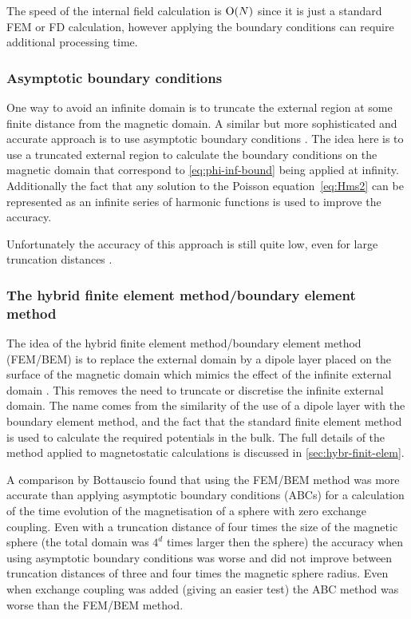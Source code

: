 The speed of the internal field calculation is $\text{O}{\left( N \right)}$ since it is just a standard FEM or FD calculation, however applying the boundary conditions can require additional processing time.



\subsubsection{Asymptotic boundary conditions}
\label{sec:asymptot-bcs}

One way to avoid an infinite domain is to truncate the external region at some finite distance from the magnetic domain.
A similar but more sophisticated and accurate approach is to use asymptotic boundary conditions \cite{Yang1997}.
The idea here is to use a truncated external region to calculate the boundary conditions on the magnetic domain that correspond to \cref{eq:phi-inf-bound} being applied at infinity.
Additionally the fact that any solution to the Poisson equation~\cref{eq:Hms2} can be represented as an infinite series of harmonic functions is used to improve the accuracy.

Unfortunately the accuracy of this approach is still quite low, even for large truncation distances \cite{Bottauscio2008}.


\subsubsection{The hybrid finite element method/boundary element method}
\label{sec:bound-elem-meth}

The idea of the hybrid finite element method/boundary element method (FEM/BEM) is to replace the external domain by a dipole layer placed on the surface of the magnetic domain which mimics the effect of the infinite external domain \cite{Fredkin1990}.
This removes the need to truncate or discretise the infinite external domain.
The name comes from the similarity of the use of a dipole layer with the boundary element method, and the fact that the standard finite element method is used to calculate the required potentials in the bulk.
The full details of the method applied to magnetostatic calculations is discussed in \cref{sec:hybr-finit-elem}.

A comparison by Bottauscio \cite{Bottauscio2008} found that using the FEM/BEM method was more accurate than applying asymptotic boundary conditions (ABCs) for a calculation of the time evolution of the magnetisation of a sphere with zero exchange coupling.
Even with a truncation distance of four times the size of the magnetic sphere (the total domain was $4^d$ times larger then the sphere) the accuracy when using asymptotic boundary conditions was worse and did not improve between truncation distances of three and four times the magnetic sphere radius.
Even when exchange coupling was added (giving an easier test) the ABC method was worse than the FEM/BEM method.

